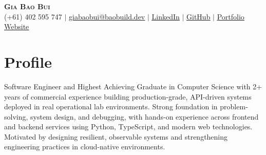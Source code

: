 \documentclass[letterpaper,11pt]{article}
\begin{document}

\begin{center}
  \textbf{\Huge \scshape Gia Bao Bui} \\ \vspace{1pt}
  \small (+61) 402 595 747 $|$ \href{mailto:giabaobui@baobuild.dev}{\uline{giabaobui@baobuild.dev}} $|$
  \href{https://www.linkedin.com/in/gia-bao-bui-227476227/}{\uline{LinkedIn}} $|$
  \href{https://github.com/giabaobui-nedy}{\uline{GitHub}} $|$
  \href{https://www.baobuild.dev/}{\uline{Portfolio Website}}
\end{center}

\section{Profile}
\small{Software Engineer and Highest Achieving Graduate in Computer Science with 2+ years of commercial experience building production-grade, API-driven systems deployed in real operational lab environments. Strong foundation in problem-solving, system design, and debugging, with hands-on experience across frontend and backend services using Python, TypeScript, and modern web technologies. Motivated by designing resilient, observable systems and strengthening engineering practices in cloud-native environments.}\justifying


\end{document}
